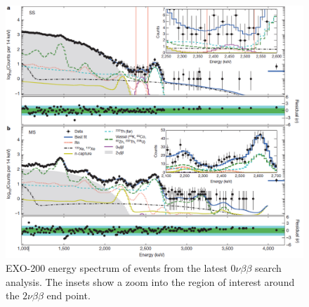 
\begin{figure} %
	\centering
	\includegraphics[width=.95\textwidth]{figures/0nu_spectrum_nature.png}
	\caption{EXO-200 energy spectrum of events from the latest $0\nu\beta\beta$ search analysis.  The insets show a zoom into the region of interest around the $2\nu\beta\beta$ end point. \cite{EXO2000nuNature}}
\label{fig:exo200data}
\end{figure}

